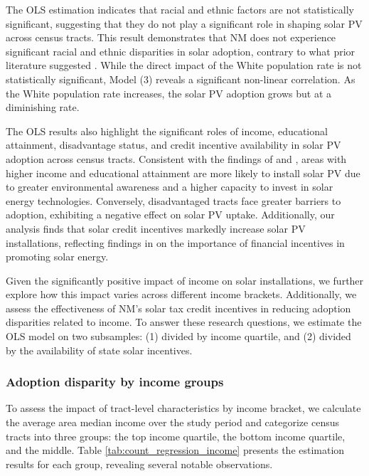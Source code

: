 \documentclass[12pt,twoside,letterpaper]{article}
\begin{document}
The OLS estimation indicates that racial and ethnic factors are not statistically significant, suggesting that they do not play a significant role in shaping solar PV across census tracts. This result demonstrates that NM does not experience significant racial and ethnic disparities in solar adoption, contrary to what prior literature suggested \parencite{gao_solar_2022,darghouth_characterizing_2022}. While the direct impact of the White population rate is not statistically significant, Model (3) reveals a significant non-linear correlation. As the White population rate increases, the solar PV adoption grows but at a diminishing rate.


The OLS results also highlight the significant roles of income, educational attainment, disadvantage status, and credit incentive availability in solar PV adoption across census tracts. Consistent with the findings of \textcite{oshaughnessy_income-targeted_2021} and \textcite{darghouth_characterizing_2022}, areas with higher income and educational attainment are more likely to install solar PV due to greater environmental awareness and a higher capacity to invest in solar energy technologies. Conversely, disadvantaged tracts face greater barriers to adoption, exhibiting a negative effect on solar PV uptake. Additionally, our analysis finds that solar credit incentives markedly increase solar PV installations, reflecting findings in \textcite{borenstein_private_2017} on the importance of financial incentives in promoting solar energy. 


Given the significantly positive impact of income on solar installations, we further explore how this impact varies across different income brackets. Additionally, we assess the effectiveness of NM's solar tax credit incentives in reducing adoption disparities related to income. To answer these research questions, we estimate the OLS model on two subsamples: (1) divided by income quartile, and (2) divided by the availability of state solar incentives.

\subsubsection{Adoption disparity by income groups}

To assess the impact of tract-level characteristics by income bracket, we calculate the average area median income over the study period and categorize census tracts into three groups: the top income quartile, the bottom income quartile, and the middle. Table \ref{tab:count_regression_income} presents the estimation results for each group, revealing several notable observations.
\end{document}
